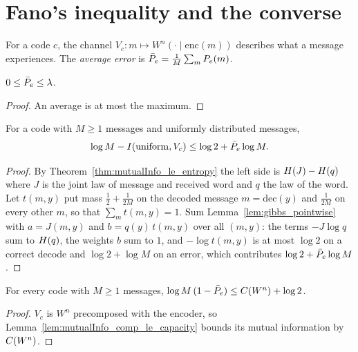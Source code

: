\chapter{Fano's inequality and the converse}
\label{chap:converse}

\begin{definition}
  \label{def:msgChannel}
  \leanok
  For a code $c$, the channel $V_c \colon m \mapsto W^n(\cdot \mid \mathrm{enc}(m))$ describes what a
  message experiences.  The \emph{average error} is $\bar P_e = \frac1M \sum_m P_e(m)$.
\end{definition}

\begin{lemma}
  \label{lem:avgError_le_maxError}
  \leanok
  $0 \le \bar P_e \le \lambda$.
\end{lemma}
\begin{proof}
  \leanok
  An average is at most the maximum.
\end{proof}

\begin{theorem}
  \label{thm:fano}
  \leanok
  For a code with $M \ge 1$ messages and uniformly distributed messages,
  \[
    \log M - I(\mathrm{uniform}, V_c) \le \log 2 + \bar P_e \log M .
  \]
\end{theorem}
\begin{proof}
  \leanok
  By Theorem~\ref{thm:mutualInfo_le_entropy} the left side is $H(J) - H(q)$ where $J$ is the
  joint law of message and received word and $q$ the law of the word.  Let $t(m, y)$ put mass
  $\frac12 + \frac1{2M}$ on the decoded message $m = \mathrm{dec}(y)$ and $\frac1{2M}$ on every other
  $m$, so that $\sum_m t(m, y) = 1$.  Sum Lemma~\ref{lem:gibbs_pointwise} with $a = J(m, y)$ and
  $b = q(y)\, t(m, y)$ over all $(m, y)$: the terms $-J \log q$ sum to $H(q)$, the weights $b$ sum
  to $1$, and $-\log t(m, y)$ is at most $\log 2$ on a correct decode and $\log 2 + \log M$ on an
  error, which contributes $\log 2 + \bar P_e \log M$.
\end{proof}

\begin{theorem}
  \label{thm:fano_capacity}
  \leanok
  For every code with $M \ge 1$ messages, $\log M \,(1 - \bar P_e) \le C(W^n) + \log 2$.
\end{theorem}
\begin{proof}
  \leanok
  $V_c$ is $W^n$ precomposed with the encoder, so Lemma~\ref{lem:mutualInfo_comp_le_capacity}
  bounds its mutual information by $C(W^n)$.
\end{proof}

